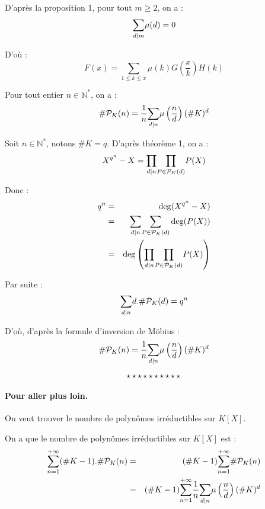 D'apr{\`e}s la proposition 1, pour tout $m \geqslant 2$, on a :
\[ \underset{d |  m}{\sum} \mu (d) = 0 \]


D'o{\`u} :
\[ F (x) = \underset{1 \leqslant k \leqslant x}{\sum} \mu (k) G \left(
   \frac{x}{k} \right) H (k) \]



Pour tout entier $n \in \mathbb{N}^{\ast}$, on a :
\[ \#\mathcal{P}_K (n) = \frac{1}{n} \underset{d | n }{\sum} \mu
   \left( \frac{n}{d} \right) (\#K)^d \]



Soit $n \in \mathbb{N}^{\ast}$, notons $\#K = q$. D'apr{\`e}s
th{\'e}or{\`e}me 1, on a :
\[ {\color[HTML]{000000}{\color[HTML]{000000}X^{q^n} - X = \underset{d | n
   \nobracket}{\prod}  \underset{P \in \mathcal{P}_K (d)}{\prod} P (X)}
   \tmcolor{black}{}} \]


Donc :
\begin{eqnarray*}
  q^n & = & \deg (X^{q^n} - X)\\
  & = & \underset{d | n }{\sum}  \underset{P \in \mathcal{P}_K
  (d)}{\sum} \deg (P (X))\\
  & = & \deg \left( \underset{d | n }{\prod}  \underset{P \in
  \mathcal{P}_K (d)}{\prod} P (X) \right)
\end{eqnarray*}


Par suite :
\[ \underset{d | n }{\sum} d.\#\mathcal{P}_K (d) = q^n \]


D'o{\`u}, d'apr{\`e}s la formule d'inversion de M{\"o}bius :
\[ \#\mathcal{P}_K (n) = \frac{1}{n} \underset{d | n }{\sum} \mu
   \left( \frac{n}{d} \right) (\#K)^d \]

\[ \star \star \star \star \star \star \star \star \star \star \]

\paragraph{Pour aller plus loin.}

On veut trouver le nombre de polyn{\^o}mes irr{\'e}ductibles sur $K [X]$.

On a que le nombre de polyn{\^o}mes irr{\'e}ductibles sur $K [X]$ est :
\begin{eqnarray*}
  \underset{n = 1}{\overset{+ \infty}{\sum}} (\#K - 1) .\#\mathcal{P}_K (n) &
  = & (\#K - 1) \underset{n = 1}{\overset{+ \infty}{\sum}} \#\mathcal{P}_K
  (n)\\
  & = & (\#K - 1) \underset{n = 1}{\overset{+ \infty}{\sum}} \frac{1}{n}
  \underset{d | n }{\sum} \mu \left( \frac{n}{d} \right) (\#K)^d
\end{eqnarray*}


